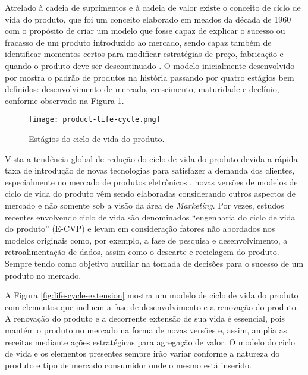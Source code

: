 	Atrelado à cadeia de suprimentos e à cadeia de valor existe o conceito de ciclo de vida do produto, que foi um conceito elaborado em meados da década de 1960 com o propósito de criar um modelo que fosse capaz de explicar o sucesso ou fracasso de um produto introduzido ao mercado, sendo capaz também de identificar momentos certos para modificar estratégias de preço, fabricação e quando o produto deve ser descontinuado \cite{cao2012lifecycle}. O modelo inicialmente desenvolvido por  mostra o padrão de produtos na história passando por quatro estágios bem definidos: desenvolvimento de mercado, crescimento, maturidade e declínio, conforme observado na Figura \ref{fig:product-life-cycle}.
	
	\begin{figure}[hbt!]
		\centering
		\caption{Estágios do ciclo de vida do produto.}
		\texttt{[image: product-life-cycle.png]}
		\label{fig:product-life-cycle}
	\end{figure}

	Vista a tendência global de redução do ciclo de vida do produto devida a rápida taxa de introdução de novas tecnologias para satisfazer a demanda dos clientes, especialmente no mercado de produtos eletrônicos \cite{trappey2008lifecycle}, novas versões de modelos de ciclo de vida do produto vêm sendo elaboradas considerando outros aspectos de mercado e não somente sob a visão da área de \textit{Marketing}. Por vezes, estudos recentes envolvendo ciclo de vida são denominados ``engenharia do ciclo de vida do produto'' (E-CVP) \cite{cao2012lifecycle} e levam em consideração fatores não abordados nos modelos originais como, por exemplo, a fase de pesquisa e desenvolvimento, a retroalimentação de dados, assim como o descarte e reciclagem do produto. Sempre tendo como objetivo auxiliar na tomada de decisões para o sucesso de um produto no mercado.
	
	A Figura \ref{fig:life-cycle-extension} mostra um modelo de ciclo de vida do produto com elementos que incluem a fase de desenvolvimento e a renovação do produto. A renovação do produto e a decorrente extensão de sua vida é essencial, pois mantém o produto no mercado na forma de novas versões e, assim, amplia as receitas mediante ações estratégicas para agregação de valor. O modelo do ciclo de vida e os elementos presentes sempre irão variar conforme a natureza do produto e tipo de mercado consumidor onde o mesmo está inserido.
	
